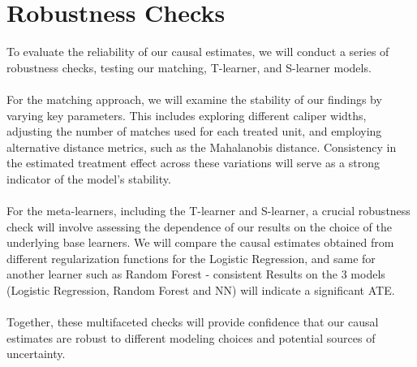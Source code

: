 \documentclass[a4paper,12pt]{article} %
\begin{document}
\section{Robustness Checks}
To evaluate the reliability of our causal estimates, we will conduct a series of robustness checks, testing our matching, T-learner, and S-learner models.\\\\
For the matching approach, we will examine the stability of our findings by varying key parameters. This includes exploring different caliper widths, adjusting the number of matches used for each treated unit, and employing alternative distance metrics, such as the Mahalanobis distance. Consistency in the estimated treatment effect across these variations will serve as a strong indicator of the model's stability.\\\\
For the meta-learners, including the T-learner and S-learner, a crucial robustness check will involve assessing the dependence of our results on the choice of the underlying base learners. We will compare the causal estimates obtained from different regularization functions for the Logistic Regression, and same for another learner such as Random Forest - consistent Results on the 3 models (Logistic Regression, Random Forest and NN) will indicate a significant ATE.\\\\
Together, these multifaceted checks will provide confidence that our causal estimates are robust to different modeling choices and potential sources of uncertainty.


\end{document}
